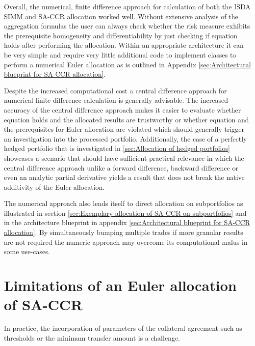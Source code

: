 \documentclass[../Thesis_AHoecherl.tex]{subfiles}
\begin{document}
    Overall, the numerical, finite difference approach for calculation of both the ISDA SIMM and SA-CCR allocation worked well. Without extensive analysis of the aggregation formulas the user can always check whether the risk measure exhibits the prerequisite homogeneity and differentiability by just checking if equation  holds after performing the allocation. 
    Within an appropriate architecture it can be very simple and require very little additional code to implement classes to perform a numerical Euler allocation as is outlined in Appendix \ref{sec:Architectural blueprint for SA-CCR allocation}.
    
    Despite the increased computational cost a central difference approach for numerical finite difference calculation is generally advisable.
    The increased accuracy of the central difference approach makes it easier to evaluate whether equation  holds and the allocated results are trustworthy or whether equation  and the prerequisites for Euler allocation are violated which should generally trigger an investigation into the processed portfolio.
    Additionally, the case of a perfectly hedged portfolio that is investigated in \ref{sec:Allocation of hedged portfolios} showcases a scenario that should have sufficient practical relevance in which the central difference approach unlike a forward difference, backward difference or even an analytic partial derivative yields a result that does not break the native additivity of the Euler allocation.

    The numerical approach also lends itself to direct allocation on subportfolios as illustrated in section \ref{sec:Exemplary allocation of SA-CCR on subportfolios} and in the architecture blueprint in appendix \ref{sec:Architectural blueprint for SA-CCR allocation}.
    By simultaneously bumping multiple trades if more granular results are not required the numeric approach may overcome its computational malus in some use-cases.

    \section{Limitations of an Euler allocation of SA-CCR\label{Limitations of an Euler allocation of SA-CCR}}

    In practice, the incorporation of parameters of the collateral agreement such as thresholds or the minimum transfer amount is a challenge.
\end{document}
